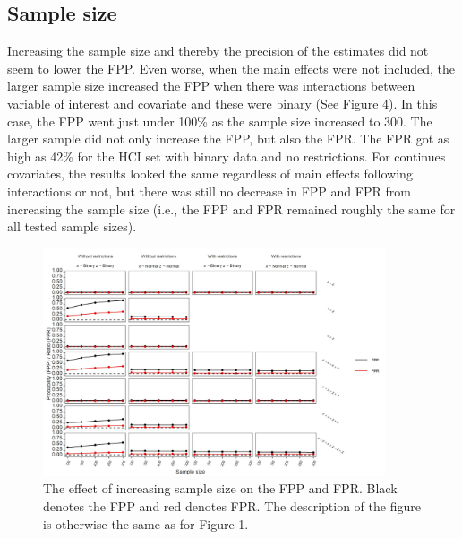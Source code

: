 \subsection{Sample size}
Increasing the sample size and thereby the precision of the estimates did not seem to lower the FPP. Even worse, when the main effects were not included, the larger sample size increased the FPP when there was interactions between variable of interest and covariate and these were binary (See Figure 4). In this case, the FPP went just under 100\% as the sample size increased to 300. The larger sample did not only increase the FPP, but also the FPR. The FPR got as high as 42\% for the HCI set with binary data and no restrictions. For continues covariates, the results looked the same regardless of main effects following interactions or not, but there was still no decrease in FPP and FPR from increasing the sample size (i.e., the FPP and FPR remained roughly the same for all tested sample sizes). 


\begin{figure}[t]
\includegraphics[width=0.9\textwidth]{R/Analysis/Result/Figures/Figure1D.jpeg}
\centering
\caption{The effect of increasing sample size on the FPP and FPR. Black denotes the FPP and red denotes FPR. The description of the figure is otherwise the same as for Figure 1.}
\label{fig:mainfigure}
\end{figure}

